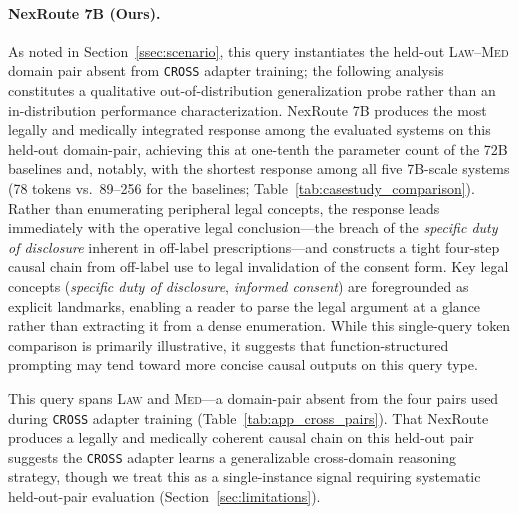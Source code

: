 \documentclass[a4paper,fleql]{cas-sc}
\begin{document}
\paragraph{NexRoute 7B (Ours).}
As noted in Section~\ref{ssec:scenario}, this query instantiates the held-out
\textsc{Law}--\textsc{Med} domain pair absent from \texttt{CROSS} adapter
training; the following analysis constitutes a qualitative out-of-distribution
generalization probe rather than an in-distribution performance characterization.
NexRoute 7B produces the most legally and medically integrated response among
the evaluated systems on this held-out domain-pair, achieving this at one-tenth
the parameter count of the 72B baselines and, notably, with the shortest response
among all five 7B-scale systems (78 tokens vs.\ 89--256 for the baselines;
Table~\ref{tab:casestudy_comparison}).
Rather than enumerating peripheral legal concepts, the response leads
immediately with the operative legal conclusion---the breach of the
\textit{specific duty of disclosure} inherent in off-label prescriptions---and
constructs a tight four-step causal chain from off-label use to legal
invalidation of the consent form. Key legal concepts (\textit{specific duty
of disclosure}, \textit{informed consent}) are foregrounded as explicit
landmarks, enabling a reader to parse the legal argument at a glance rather
than extracting it from a dense enumeration. While this single-query token comparison is primarily illustrative, it
suggests that function-structured prompting may tend toward more concise
causal outputs on this query type.

This query spans \textsc{Law} and \textsc{Med}---a domain-pair absent from
the four pairs used during \texttt{CROSS} adapter training
(Table~\ref{tab:app_cross_pairs}). That NexRoute produces a legally and
medically coherent causal chain on this held-out pair suggests the
\texttt{CROSS} adapter learns a generalizable cross-domain reasoning strategy,
though we treat this as a single-instance signal requiring systematic
held-out-pair evaluation (Section~\ref{sec:limitations}).
\end{document}
